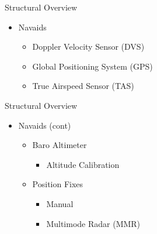 \begin{frame}
Structural Overview
\begin{itemize}
	\item Navaids
	\begin{itemize}
		\item Doppler Velocity Sensor (DVS)
		\item Global Positioning System (GPS)
		\item True Airspeed Sensor (TAS)
	\end{itemize}
\end{itemize}
\end{frame}

\begin{frame}
Structural Overview
\begin{itemize}
	\item Navaids (cont)
	\begin{itemize}
		\item Baro Altimeter
			\begin{itemize}
				\item Altitude Calibration
			\end{itemize}
		\item Position Fixes
			\begin{itemize}
				\item Manual
				\item Multimode Radar (MMR)
			\end{itemize}
	\end{itemize}
\end{itemize}
\end{frame}
